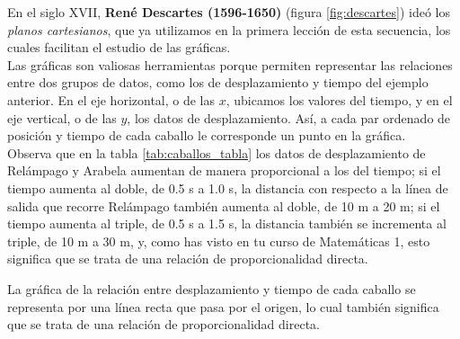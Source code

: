 \documentclass[11pt]{book}
\begin{document}
\begin{minipage}[t]{0.65\linewidth}
  En el siglo XVII, \textbf{René Descartes (1596-1650)} (figura \ref{fig:descartes}) ideó los
  \emph{planos cartesianos}, que ya utilizamos en la primera lección de esta secuencia, los cuales
  facilitan el estudio de las gráficas.\\

  Las gráficas son valiosas herramientas porque permiten representar las relaciones entre dos
  grupos de datos, como los de desplazamiento y tiempo del ejemplo anterior. En el eje horizontal,
  o de las $x$, ubicamos los valores del tiempo, y en el eje vertical, o de las $y$, los datos de
  desplazamiento. Así, a cada par ordenado de posición y tiempo de cada caballo le corresponde
  un punto en la gráfica.\\

  Observa que en la tabla \ref{tab:caballos_tabla} los datos de desplazamiento de Relámpago y Arabela aumentan de manera
  proporcional a los del tiempo; si el tiempo aumenta al doble, de 0.5 s a 1.0 s, la distancia
  con respecto a la línea de salida que recorre Relámpago también aumenta al doble, de 10 m a 20 m;
  si el tiempo aumenta al triple, de 0.5 s a 1.5 s, la distancia también se incrementa al triple,
  de 10 m a 30 m, y, como has visto en tu curso de Matemáticas 1, esto significa que se trata de
  una relación de proporcionalidad directa.

  La gráfica de la relación entre desplazamiento y tiempo de cada caballo se representa por una
  línea recta que pasa por el origen, lo cual también significa que se trata de una relación de
  proporcionalidad directa.
\end{minipage}\hfill
\end{document}
